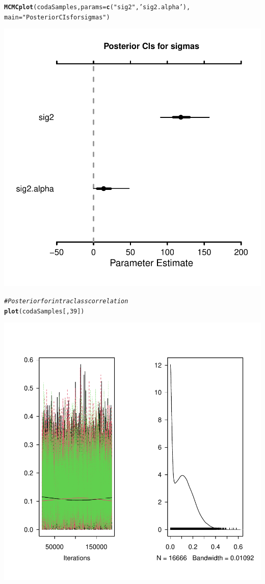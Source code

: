 \documentclass{article}\usepackage[]{graphicx}\usepackage[]{color}
\makeatletter
\newcommand{\hlnum}[1]{\textcolor[rgb]{0.686,0.059,0.569}{#1}}%
\newcommand{\hlstr}[1]{\textcolor[rgb]{0.192,0.494,0.8}{#1}}%
\newcommand{\hlcom}[1]{\textcolor[rgb]{0.678,0.584,0.686}{\textit{#1}}}%
\newcommand{\hlstd}[1]{\textcolor[rgb]{0.345,0.345,0.345}{#1}}%
\newcommand{\hlkwc}[1]{\textcolor[rgb]{0.333,0.667,0.333}{#1}}%
\newcommand{\hlkwd}[1]{\textcolor[rgb]{0.737,0.353,0.396}{\textbf{#1}}}%
\newenvironment{kframe}{%
 \def\at@end@of@kframe{}%
 \ifinner\ifhmode%
  \def\at@end@of@kframe{\end{minipage}}%
  \begin{minipage}{\columnwidth}%
 \fi\fi%
 \def\FrameCommand##1{\hskip\@totalleftmargin \hskip-\fboxsep
 \colorbox{shadecolor}{##1}\hskip-\fboxsep
     \hskip-\linewidth \hskip-\@totalleftmargin \hskip\columnwidth}%
 \MakeFramed {\advance\hsize-\width
   \@totalleftmargin\z@ \linewidth\hsize
   \@setminipage}}%
 {\par\unskip\endMakeFramed%
 \at@end@of@kframe}
\newenvironment{knitrout}{}{} %
\makeatother
\begin{document}
\begin{knitrout}
{}


\begin{kframe}\begin{alltt}
\hlkwd{MCMCplot}\hlstd{(codaSamples,} \hlkwc{params} \hlstd{=} \hlkwd{c}\hlstd{(}\hlstr{"sig2"}\hlstd{,}\hlstr{'sig2.alpha'}\hlstd{),}
         \hlkwc{main} \hlstd{=} \hlstr{"Posterior CIs for sigmas"}\hlstd{)}
\end{alltt}
\end{kframe}

{\centering \includegraphics[width=.6\linewidth]{figure/FinalRFile-4350-Rnwauto-report-22} 

}


\begin{kframe}\begin{alltt}
\hlcom{# Posterior for intraclass correlation}
\hlkwd{plot}\hlstd{(codaSamples[,}\hlnum{39}\hlstd{])}
\end{alltt}
\end{kframe}

{\centering \includegraphics[width=.6\linewidth]{figure/FinalRFile-4350-Rnwauto-report-23} 

}
\end{knitrout}
\end{document}
